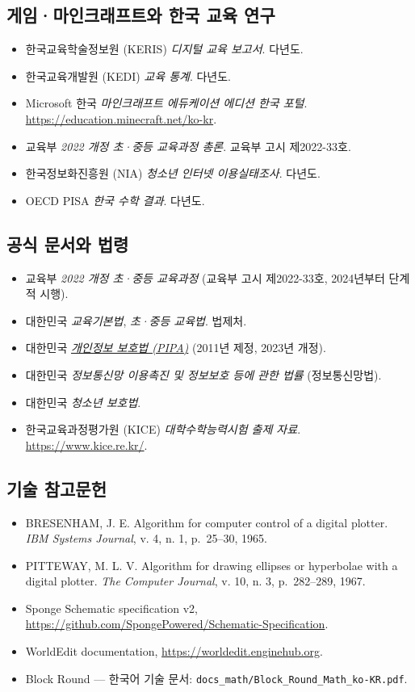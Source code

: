 \documentclass[12pt,a4paper]{scrartcl}
\begin{document}
\subsection{게임·마인크래프트와 한국 교육 연구}
\begin{itemize}[leftmargin=1.3em,itemsep=0.15em,topsep=0.3em]
  \item 한국교육학술정보원 (KERIS) \emph{디지털 교육 보고서}. 다년도.
  \item 한국교육개발원 (KEDI) \emph{교육 통계}. 다년도.
  \item Microsoft 한국 \emph{마인크래프트 에듀케이션 에디션 한국 포털}. \url{https://education.minecraft.net/ko-kr}.
  \item 교육부 \emph{2022 개정 초·중등 교육과정 총론}. 교육부 고시 제2022-33호.
  \item 한국정보화진흥원 (NIA) \emph{청소년 인터넷 이용실태조사}. 다년도.
  \item OECD PISA \emph{한국 수학 결과}. 다년도.
\end{itemize}

\subsection{공식 문서와 법령}
\begin{itemize}[leftmargin=1.3em,itemsep=0.15em,topsep=0.3em]
  \item 교육부 \emph{2022 개정 초·중등 교육과정} (교육부 고시 제2022-33호, 2024년부터 단계적 시행).
  \item 대한민국 \emph{교육기본법}, \emph{초·중등 교육법}. 법제처.
  \item 대한민국 \href{https://www.law.go.kr/}{\emph{개인정보 보호법 (PIPA)}} (2011년 제정, 2023년 개정).
  \item 대한민국 \emph{정보통신망 이용촉진 및 정보보호 등에 관한 법률} (정보통신망법).
  \item 대한민국 \emph{청소년 보호법}.
  \item 한국교육과정평가원 (KICE) \emph{대학수학능력시험 출제 자료}. \url{https://www.kice.re.kr/}.
\end{itemize}

\subsection{기술 참고문헌}
\begin{itemize}[leftmargin=1.3em,itemsep=0.15em,topsep=0.3em]
  \item BRESENHAM, J. E. Algorithm for computer control of a digital plotter. \emph{IBM Systems Journal}, v. 4, n. 1, p.~25--30, 1965.
  \item PITTEWAY, M. L. V. Algorithm for drawing ellipses or hyperbolae with a digital plotter. \emph{The Computer Journal}, v. 10, n. 3, p.~282--289, 1967.
  \item Sponge Schematic specification v2, \url{https://github.com/SpongePowered/Schematic-Specification}.
  \item WorldEdit documentation, \url{https://worldedit.enginehub.org}.
  \item Block Round --- 한국어 기술 문서: \texttt{docs\_math/Block\_Round\_Math\_ko-KR.pdf}.
\end{itemize}
\end{document}
